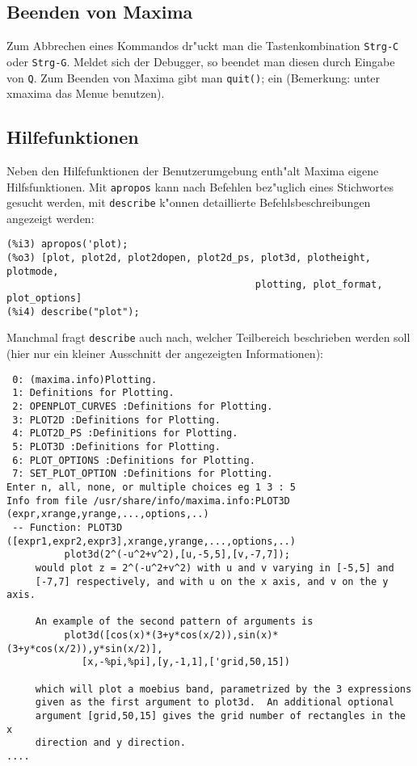 \documentclass[spanish,12pt,a4paper]{article}
\begin{document}
\subsection{Beenden von Maxima}


Zum Abbrechen eines Kommandos dr"uckt man die Tastenkombination \verb|Strg-C| oder \verb|Strg-G|. Meldet sich der Debugger, so beendet man diesen durch Eingabe von \verb|Q|.
Zum Beenden von Maxima gibt man \verb|quit()|; ein (Bemerkung: unter xmaxima das Menue benutzen).


\subsection{Hilfefunktionen}

Neben den Hilfefunktionen der Benutzerumgebung enth"alt Maxima eigene Hilfsfunktionen. Mit \verb|apropos| kann nach Befehlen bez"uglich eines Stichwortes gesucht werden, mit \verb|describe| k"onnen detaillierte Befehlsbeschreibungen angezeigt werden:

\scriptsize
\begin{verbatim}
(%i3) apropos('plot);
(%o3) [plot, plot2d, plot2dopen, plot2d_ps, plot3d, plotheight, plotmode, 
                                           plotting, plot_format, plot_options]
(%i4) describe("plot");
\end{verbatim}
\normalsize

Manchmal fragt \verb|describe| auch nach, welcher Teilbereich beschrieben werden soll (hier nur ein kleiner Ausschnitt der angezeigten Informationen):
\scriptsize
\begin{verbatim}
 0: (maxima.info)Plotting.
 1: Definitions for Plotting.
 2: OPENPLOT_CURVES :Definitions for Plotting.
 3: PLOT2D :Definitions for Plotting.
 4: PLOT2D_PS :Definitions for Plotting.
 5: PLOT3D :Definitions for Plotting.
 6: PLOT_OPTIONS :Definitions for Plotting.
 7: SET_PLOT_OPTION :Definitions for Plotting.
Enter n, all, none, or multiple choices eg 1 3 : 5
Info from file /usr/share/info/maxima.info:PLOT3D (expr,xrange,yrange,...,options,..)
 -- Function: PLOT3D ([expr1,expr2,expr3],xrange,yrange,...,options,..)
          plot3d(2^(-u^2+v^2),[u,-5,5],[v,-7,7]);
     would plot z = 2^(-u^2+v^2) with u and v varying in [-5,5] and
     [-7,7] respectively, and with u on the x axis, and v on the y axis.

     An example of the second pattern of arguments is
          plot3d([cos(x)*(3+y*cos(x/2)),sin(x)*(3+y*cos(x/2)),y*sin(x/2)],
             [x,-%pi,%pi],[y,-1,1],['grid,50,15])

     which will plot a moebius band, parametrized by the 3 expressions
     given as the first argument to plot3d.  An additional optional
     argument [grid,50,15] gives the grid number of rectangles in the x
     direction and y direction.
....
\end{verbatim}
\normalsize
\end{document}
